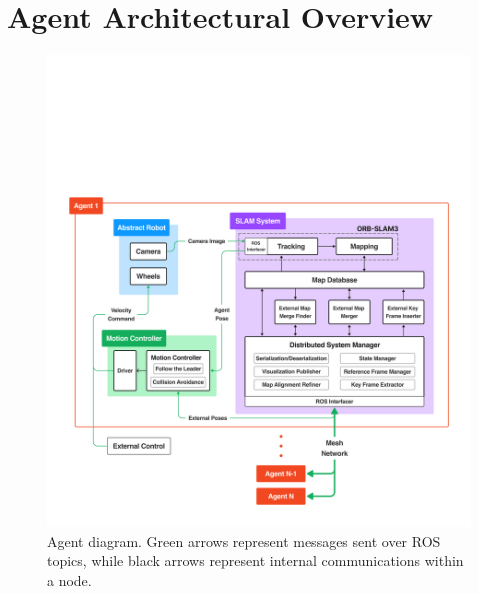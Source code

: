 






\label{sec:3}

\section{Agent Architectural Overview}
\label{sec:architectural-overview}

\begin{figure}[h]
    \centering
    \includegraphics[trim=5cm 5cm 5cm 32cm, scale=0.2]{figures/agent_diagram.pdf}
    \caption{Agent diagram. Green arrows represent messages sent over ROS topics, while black arrows represent internal communications within a node.}
    \label{fig:agent-diagram}
\end{figure}

